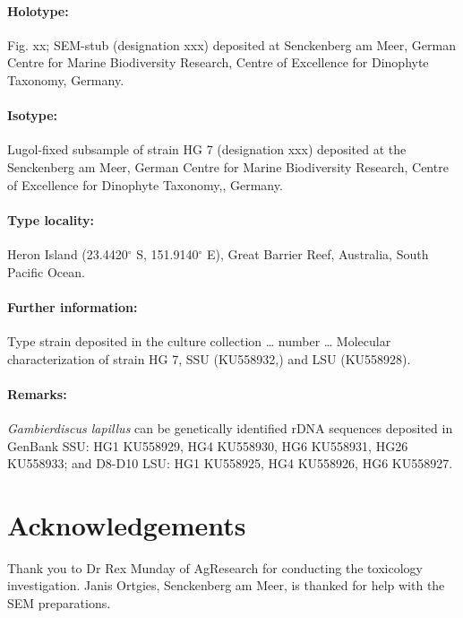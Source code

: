 \documentclass[12pt]{article}
\begin{document}
\paragraph{Holotype:} Fig. xx; SEM-stub (designation xxx) deposited at Senckenberg am Meer, German Centre for Marine Biodiversity Research, Centre of Excellence for Dinophyte Taxonomy, Germany.  \\

\paragraph{Isotype:}Lugol-fixed subsample of strain HG 7 (designation xxx) deposited at the Senckenberg am Meer, German Centre for Marine Biodiversity Research, Centre of Excellence for Dinophyte Taxonomy,, Germany.  \\

\paragraph{Type locality:} Heron Island (23.4420$^{\circ}$ S, 151.9140$^{\circ}$ E), Great Barrier Reef, Australia, South Pacific Ocean.
\paragraph{Further information:} Type strain deposited in the culture collection … number … Molecular characterization of strain HG 7, SSU (KU558932,) and LSU (KU558928).
\paragraph{Remarks:} \emph{Gambierdiscus lapillus} can be genetically identified rDNA sequences deposited in GenBank SSU: HG1 KU558929, HG4 KU558930, HG6 KU558931, HG26 KU558933; and D8-D10 LSU: HG1 KU558925, HG4 KU558926, HG6 KU558927. 

\newpage
\section{Acknowledgements}
Thank you to Dr Rex Munday of AgResearch for conducting the toxicology investigation. 
Janis Ortgies, Senckenberg am Meer, is thanked for help with the SEM preparations.
\end{document}
